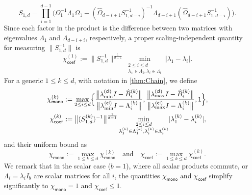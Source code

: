 \documentclass{article}
\newcommand{\defi}{:=}
\newcommand{\chim}{\chi_{\mathsf{mono}}}
\newcommand{\chic}{\chi_{\mathsf{coef}}}
\newcommand{\cl}{(\mathsf{cl})}
\providecommand{\abs}[1]{\lvert#1\rvert}
\providecommand{\norm}[1]{\lVert#1\rVert}
\providecommand{\bignorm}[1]{\bigl\lVert#1\bigr\rVert}
\begin{document}
\begin{equation*}
    S_{1,d} = \prod_{i=1}^{d-1}\bigl(\Omega_{1}^{-1}\Lambda_{1}\Omega_{1}-(\widehat{\Omega}_{d-i+1}S_{1,d-i}^{-1})^{-1}\Lambda_{d-i+1}(\widehat{\Omega}_{d-i+1}S_{1,d-i}^{-1})\bigr).
\end{equation*}
Since each factor in the product is the difference between two matrices with eigenvalues $\Lambda_{1}$ and $\Lambda_{d-i+i}$, respectively, a proper scaling-independent quantity for measuring  $\norm{S_{1,d}^{-1}}$ is 
\begin{equation*}
    \chic^{(1)}\defi \norm{S_{1,d}^{-1}}^{\frac{1}{d-1}}\min_{\substack{2\leq i\leq d\\ \lambda_{1}\in \Lambda_{1}, \lambda_{i}\in \Lambda_{i}}} \abs{\lambda_{1}-\lambda_{i}}.
\end{equation*}
For a generic $1\leq k\leq d$, with notation in \cref{thm:Chain}, we define 
\begin{equation*}
    \begin{aligned}
        \chim^{(k)} &\defi  \max_{2\leq i\leq d}\Bigl\{ \frac{\bignorm{\lambda_{\min}^{\cl}I-\widehat{B}_{i}^{(k)}}}{\bignorm{\lambda_{\min}^{\cl}I-\Lambda_{i}^{(k)}}},\frac{\bignorm{\lambda_{\max}^{\cl}I-\widehat{B}_{i}^{(k)}}}{\bignorm{\lambda_{\max}^{\cl}I-\Lambda_{i}^{(k)}}},1\Bigr\},\\ 
        \chic^{(k)} &\defi \bignorm{(S_{1,d}^{(k)})^{-1}}^{\frac{1}{d-1}}\min_{\substack{2\leq i\leq d\\ \lambda_{1}^{(k)}\in \Lambda_{1}^{(k)}, \lambda_{i}^{(k)}\in \Lambda_{i}^{(k)}}} \abs{\lambda_{1}^{(k)}-\lambda_{i}^{(k)}},
    \end{aligned}
\end{equation*}
and their uniform bound as 
\begin{equation}
    \label{eq:defchi}
    \chim \defi \max_{1\leq k\leq d}\chim^{(k)}
    \quad\text{and}\quad
    \chic \defi \max_{1\leq k\leq d}\chic^{(k)}.  
\end{equation}
We remark that in the scalar case ($b=1$), where all scalar products commute, or $\Lambda_{i}=\lambda_{i} I_{b}$ are scalar matrices for all $i$, the quantities $\chim$ and $\chic$ simplify significantly to $\chim=1$ and $\chic\leq 1$.
\end{document}
